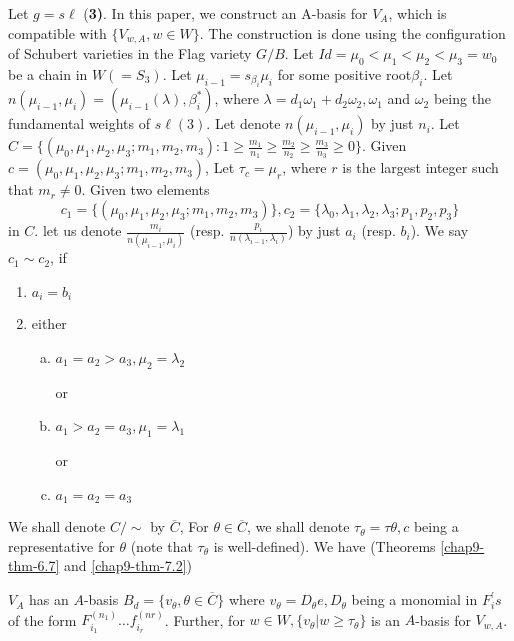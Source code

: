 Let $g=s\ell$ {(\bf 3)}. In this paper, we construct an A-basis for $V_{A}$, which is compatible with $\{V_{w,A}, w \in W\}$. The construction is done using the configuration of Schubert varieties in the Flag variety $G/B$. Let $Id=\mu_{0} < \mu_{1} < \mu_{2} < \mu_{3} = w_{0}$ be a chain  in $W(=S_{3})$. Let $\mu_{i-1} = s_{\beta_{i}}\mu_{i}$ for some positive root\pageoriginale $\beta_{i}$. Let $n(\mu_{i-1},\mu_{i})= (\mu_{i-1}(\lambda), \beta_{i}^{*})$, where $\lambda = d_{1}\omega_{1} + d_{2}\omega_{2}, \omega_{1}$ and $\omega_{2}$ being the fundamental weights of $s\ell(3)$. Let denote $n(\mu_{i-1}, \mu_{i})$ by just $n_{i}$. Let $C = \{ (\mu_{0}, \mu_{1}, \mu_{2}, \mu_{3};m_{1}, m_{2}, m_{3}) : 1 \geq \frac{m_{1}}{n_{1}}\geq \frac{m_{2}}{n_{2}} \geq \frac{m_{3}}{n_{3}} \geq 0 \}$. Given $c=(\mu_{0}, \mu_{1}, \mu_{2}, \mu_{3};m_{1}, m_{2}, m_{3})$, Let $\tau_{c} = \mu_{r}$, where $r$ is the largest integer such that $m_{r}\neq 0$. Given two elements
$$
c_{1} = \{(\mu_{0}, \mu_{1}, \mu_{2}, \mu_{3};m_{1}, m_{2}, m_{3})\}, c_{2}=\{ \lambda_{0}, \lambda_{1}, \lambda_{2}, \lambda_{3} ; p_{1}, p_{2},p_{3}\}
$$
in $C$. let us denote $\frac{m_{i}}{n(\mu_{i-1},\mu_{i})}$ (resp. $\frac{p_{i}}{n(\lambda_{i-1}, \lambda_{i})}$) by just $a_{i}$ (resp. $b_{i}$). We say $c_{1}\sim c_{2}$, if
\begin{enumerate}[(1)]
\item $a_{i}= b_{i}$
\item either
   \begin{enumerate}[(a)]
    \item $a_{1} =a_{2} > a_{3}, \mu_{2} = \lambda_{2}$

    or 

    \item $a_{1} > a_{2} =a_{3}, \mu_{1} =\lambda_{1}$

    or

    \item $a_{1} = a_{2} = a_{3} $
    \end{enumerate}
\end{enumerate}
We shall denote $C/\sim $ by $\overline{C}$, For $\theta \in \overline{C}$, we shall denote $\tau_{\theta} = \tau{\theta}, c$ being a representative for $\theta$ (note that $\tau_{\theta}$ is well-defined). We have (Theorems \ref{chap9-thm-6.7} and \ref{chap9-thm-7.2})

\begin{theorem*}
$V_{A}$ has an $A$-basis $B_{d}=\{v_{\theta}, \theta \in \overline{C}\}$ where $v_{\theta} = D_{\theta}e, D_{\theta}$
being a monomial in $F_{i}^{'}s$ of the form $F_{i_{1}}^{(n_{1})}\ldots f_{i_{r}}^{(nr)}$. Further, for
$w \in W, \{v_{\theta} | w \geq \tau_{\theta}\}$ is an $A$-basis for $V_{w, A}$.
 \end{theorem*}

